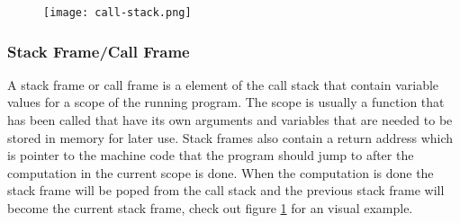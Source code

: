 \begin{figure}[h]
    \centering
    \texttt{[image: call-stack.png]}
    \label{fig:callstack}
\end{figure}


\subsubsection{Stack Frame/Call Frame}
A stack frame or call frame is a element of the call stack that contain variable values for a scope of the running program.
The scope is usually a function that has been called that have its own arguments and variables that are needed to be stored in memory for later use.
Stack frames also contain a return address which is pointer to the machine code that the program should jump to after the computation in the current scope is done.
When the computation is done the stack frame will be poped from the call stack and the previous stack frame will become the current stack frame, check out figure \ref{fig:callstack} for an visual example.


